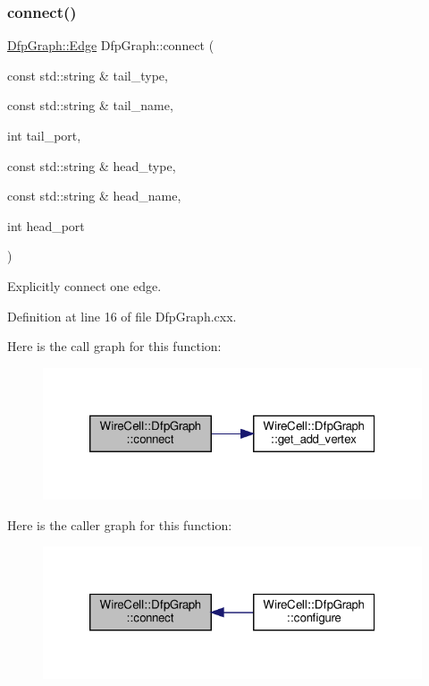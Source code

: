 \subsubsection{\texorpdfstring{connect()}{connect()}}
{\footnotesize\ttfamily \hyperlink{struct_wire_cell_1_1_dfp_graph_af3fc4fb6130bbad095ffe90480d59998}{Dfp\+Graph\+::\+Edge} Dfp\+Graph\+::connect (\begin{DoxyParamCaption}\item[{const std\+::string \&}]{tail\+\_\+type,  }\item[{const std\+::string \&}]{tail\+\_\+name,  }\item[{int}]{tail\+\_\+port,  }\item[{const std\+::string \&}]{head\+\_\+type,  }\item[{const std\+::string \&}]{head\+\_\+name,  }\item[{int}]{head\+\_\+port }\end{DoxyParamCaption})}



Explicitly connect one edge. 



Definition at line 16 of file Dfp\+Graph.\+cxx.

Here is the call graph for this function\+:
\nopagebreak
\begin{figure}[H]
\begin{center}
\leavevmode
\includegraphics[width=320pt]{struct_wire_cell_1_1_dfp_graph_af4a13a365021fdaf75e8aa699bc7262f_cgraph}
\end{center}
\end{figure}
Here is the caller graph for this function\+:
\nopagebreak
\begin{figure}[H]
\begin{center}
\leavevmode
\includegraphics[width=320pt]{struct_wire_cell_1_1_dfp_graph_af4a13a365021fdaf75e8aa699bc7262f_icgraph}
\end{center}
\end{figure}
\mbox{\label{struct_wire_cell_1_1_dfp_graph_ae88aaad51c4b745653f97e5452048d74}} 
